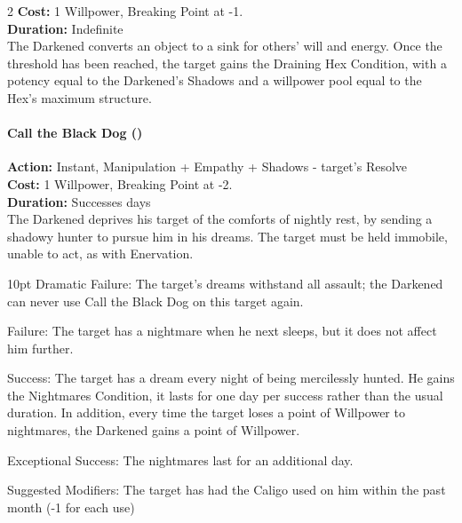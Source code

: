 \begin{multicols}{2}
\noindent \textbf{Cost:} 1 Willpower, Breaking Point at -1.\\

\noindent \textbf{Duration:} Indefinite \\

The Darkened converts an object to a sink for others' will and energy. Once the threshold has been reached, the target gains the Draining Hex Condition, with a potency equal to the Darkened's Shadows and a willpower pool equal to the Hex's maximum structure.\\

\paragraph*{Call the Black Dog (\textbullet\textbullet\textbullet)} 

\noindent \textbf{Action:} Instant, Manipulation + Empathy + Shadows - target's Resolve\\

\noindent \textbf{Cost:} 1 Willpower, Breaking Point at -2.\\

\noindent \textbf{Duration:} Successes days \\

\noindent The Darkened deprives his target of the comforts of nightly rest, by sending a shadowy hunter to pursue him in his dreams. The target must be held immobile, unable to act, as with Enervation.

   \begin{myindentpar}{10pt} Dramatic Failure: The target's dreams withstand all assault; the Darkened can never use Call the Black Dog on this target again.
    
    Failure: The target has a nightmare when he next sleeps, but it does not affect him further.
    
    Success: The target has a dream every night of being mercilessly hunted. He gains the Nightmares Condition, it lasts for one day per success rather than the usual duration. In addition, every time the target loses a point of Willpower to nightmares, the Darkened gains a point of Willpower. 
    
    Exceptional Success: The nightmares last for an additional day. 

Suggested Modifiers: The target has had the Caligo used on him within the past month (-1 for each use)\end{myindentpar}


\end{multicols}
